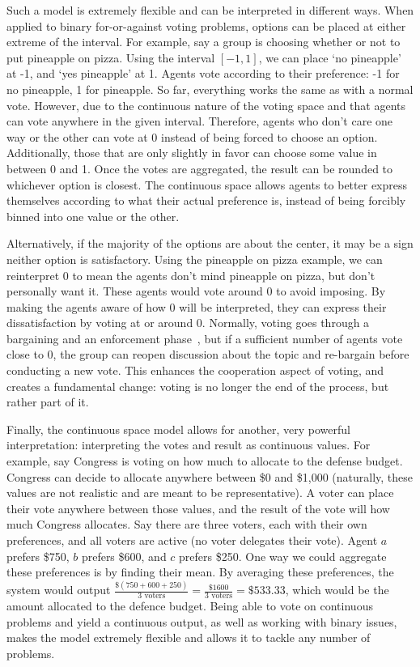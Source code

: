 Such a model is extremely flexible and can be interpreted in different ways.
When applied to binary for-or-against voting problems, options can be placed at either
extreme of the interval.
For example, say a group is choosing whether or not to put pineapple on pizza.
Using the interval $[-1, 1]$, we can place `no pineapple' at -1, and `yes pineapple'
at 1.
Agents vote according to their preference: -1 for no pineapple, 1 for pineapple.
So far, everything works the same as with a normal vote.
However, due to the continuous nature of the voting space and that agents can vote
anywhere in the given interval.
Therefore, agents who don't care one way or the other can vote at 0 instead of being
forced to choose an option.
Additionally, those that are only slightly in favor can choose some value in between
0 and 1.
Once the votes are aggregated, the result can be rounded to whichever option is
closest.
The continuous space allows agents to better express themselves according to what
their actual preference is, instead of being forcibly binned into one value or the
other.

Alternatively, if the majority of the options are about the center, it may be a sign
neither option is satisfactory.
Using the pineapple on pizza example, we can reinterpret 0 to mean the agents don't
mind pineapple on pizza, but don't personally want it.
These agents would vote around 0 to avoid imposing.
By making the agents aware of how 0 will be interpreted, they can express their
dissatisfaction by voting at or around 0.
Normally, voting goes through a bargaining and an enforcement
phase~\cite{Fearon1998}, but if a sufficient number of agents vote close to 0, the
group can reopen discussion about the topic and re-bargain before conducting a new vote.
This enhances the cooperation aspect of voting, and creates a fundamental change:
voting is no longer the end of the process, but rather part of it.

Finally, the continuous space model allows for another, very powerful interpretation:
interpreting the votes and result as continuous values.
For example, say Congress is voting on how much to allocate to the defense budget.
Congress can decide to allocate anywhere between \$0 and \$1,000 (naturally, these
values are not realistic and are meant to be representative).
A voter can place their vote anywhere between those values, and the result of the
vote will how much Congress allocates.
Say there are three voters, each with their own preferences, and all voters are
active (no voter delegates their vote).
Agent $a$ prefers \$750, $b$ prefers \$600, and $c$ prefers \$250.
One way we could aggregate these preferences is by finding their mean.
By averaging these preferences, the system would output
$\frac{\$(750 + 600 + 250)}{3 \text{ voters}} = \frac{\$1600}{3 \text{ voters}} =
\$533.33$,
which would be the amount allocated to the defence budget.
Being able to vote on continuous problems and yield a continuous output, as well as
working with binary issues, makes the model extremely flexible and allows it to
tackle any number of problems.

